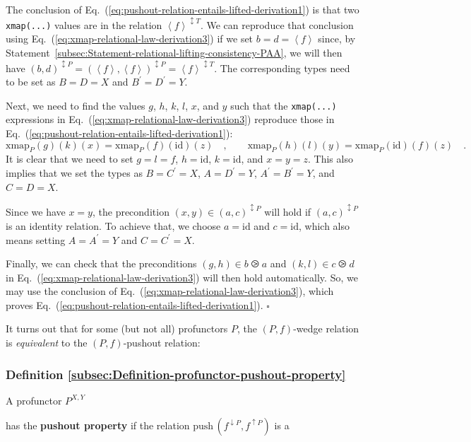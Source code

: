 The conclusion of Eq.~(\ref{eq:pushout-relation-entails-lifted-derivation1})
is that two \lstinline!xmap(...)! values are in the relation $\left<f\right>^{\updownarrow T}$.
We can reproduce that conclusion using Eq.~(\ref{eq:xmap-relational-law-derivation3})
if we set $b=d=\left<f\right>$ since, by Statement~\ref{subsec:Statement-relational-lifting-consistency-PAA},
we will then have $(b,d)^{\updownarrow P}=(\left<f\right>,\left<f\right>)^{\updownarrow P}=\left<f\right>^{\updownarrow T}$.
The corresponding types need to be set as $B=D=X$ and $B^{\prime}=D^{\prime}=Y$.

Next, we need to find the values $g$, $h$, $k$, $l$, $x$, and
$y$ such that the \lstinline!xmap(...)! expressions in Eq.~(\ref{eq:xmap-relational-law-derivation3})
reproduce those in Eq.~(\ref{eq:pushout-relation-entails-lifted-derivation1}):
\[
\text{xmap}_{P}(g)(k)(x)=\text{xmap}_{P}(f)(\text{id})(z)\quad,\quad\quad\text{xmap}_{P}(h)(l)(y)=\text{xmap}_{P}(\text{id})(f)(z)\quad.
\]
It is clear that we need to set $g=l=f$, $h=\text{id}$, $k=\text{id}$,
and $x=y=z$. This also implies that we set the types as $B=C^{\prime}=X$,
$A=D^{\prime}=Y$, $A^{\prime}=B^{\prime}=Y$, and $C=D=X$.

Since we have $x=y$, the precondition $(x,y)\in(a,c)^{\updownarrow P}$
will hold if $(a,c)^{\updownarrow P}$ is an identity relation. To
achieve that, we choose $a=\text{id}$ and $c=\text{id}$, which also
means setting $A=A^{\prime}=Y$ and $C=C^{\prime}=X$. 

Finally, we can check that the preconditions $(g,h)\in b\ogreaterthan a$
and $(k,l)\in c\ogreaterthan d$ in Eq.~(\ref{eq:xmap-relational-law-derivation3})
will then hold automatically. So, we may use the conclusion of Eq.~(\ref{eq:xmap-relational-law-derivation3}),
which proves Eq.~(\ref{eq:pushout-relation-entails-lifted-derivation1}).
$\square$

It turns out that for some (but not all) profunctors $P$, the $\left(P,f\right)$-wedge
relation is \emph{equivalent} to the $\left(P,f\right)$-pushout relation:

\subsubsection{Definition \label{subsec:Definition-profunctor-pushout-property}\ref{subsec:Definition-profunctor-pushout-property}}

A profunctor $P^{X,Y}$ %
\begin{comment}
empty arrow
\end{comment}
{} has the \textbf{pushout property}
if the relation $\text{push}\,(f^{\downarrow P},f^{\uparrow P})$
is a


